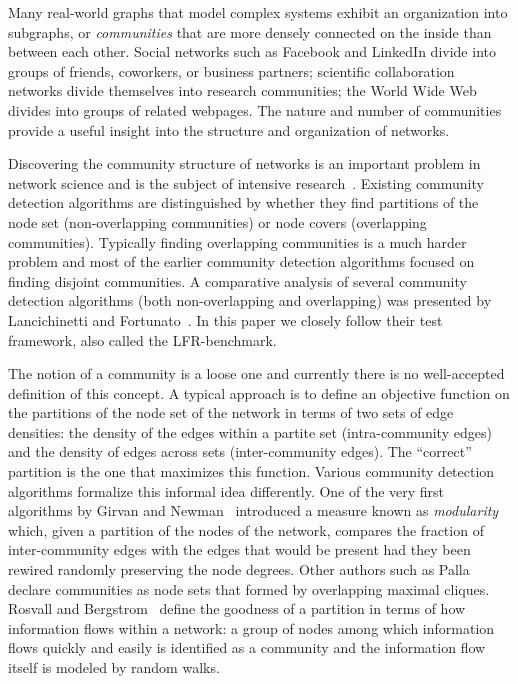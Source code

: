 Many real-world graphs that model complex systems exhibit an organization 
into subgraphs, or \textit{communities} that are more densely connected on the inside than between each other. 
Social networks such as Facebook and LinkedIn divide into groups of friends, 
coworkers, or business partners; scientific collaboration networks divide 
themselves into research communities; the World Wide Web divides into groups 
of related webpages. The nature and number of communities provide 
a useful insight into the structure and organization of networks. 

Discovering the community structure of networks is an 
important problem in network science and is the subject 
of intensive research~\cite{GN02,GN04,CNM04,RCC04,DM04,PDFV05,NL07,BGLL08,RB08,RN09}. 
Existing community detection algorithms are 
distinguished by whether they find partitions of the node set 
(non-overlapping communities) or node covers (overlapping communities). 
Typically finding overlapping communities is a much harder problem and most of the 
earlier community detection algorithms focused on finding disjoint 
communities. A comparative analysis of several community detection algorithms 
(both non-overlapping and overlapping) was presented by Lancichinetti and Fortunato~\cite{LF09}. 
In this paper we closely follow their test framework, also called the LFR-benchmark.

The notion of a community is a loose one and currently there is no 
well-accepted definition of this concept. A typical approach is to define an 
objective function on the partitions of the node set of the network 
in terms of two sets of edge densities: the density of the 
edges within a partite set (intra-community edges) and the density of edges across 
sets (inter-community edges). The ``correct'' partition is the one that maximizes this 
function. Various community detection algorithms formalize this
informal idea differently. One of the very first algorithms by
Girvan and Newman~\cite{GN02} introduced a measure known as \textit{modularity}
which, given a partition of the nodes of the network, compares the fraction of 
inter-community edges with the edges that would be present had they been 
rewired randomly preserving the node degrees. Other authors such as Palla 
\etal~\cite{PDFV05} declare communities as node sets that formed 
by overlapping maximal cliques. Rosvall and Bergstrom~\cite{RB08} 
define the goodness of a partition in terms of how information flows within a network: 
a group of nodes among which information flows quickly and easily is identified 
as a community and the information flow itself is modeled by random walks.


